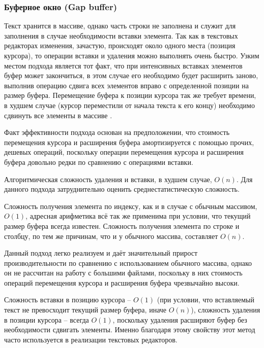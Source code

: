 \documentclass{fefu}
\begin{document}
			\subsubsection{Буферное окно (Gap buffer)}
				\par Текст хранится в массиве, однако часть строки не заполнена и служит для
				заполнения в случае необходимости вставки элемента. Так как в текстовых
				редакторах изменения, зачастую, происходят около одного места (позиция 
				курсора), то операции вставки и удаления можно выполнять очень быстро.
				Узким местом подхода является тот факт, что при интенсивных вставках элементов
				буфер может закончиться, в этом случае его необходимо будет расширить заново,
				выполнив операцию сдвига всех элементов вправо с определенной позиции на размер
				буфера. Перемещение буфера к позиции курсора так же требует времени, в худшем 
				случае (курсор переместили от начала текста к его концу) необходимо сдвинуть
				все элементы в массиве \cite{GapBufferArticle}.
				\par Факт эффективности подхода основан на предположении, что стоимость
				перемещения курсора и расширения буфера амортизируется с помощью прочих,
				дешевых операций, поскольку операции перемещения курсора и расширения буфера
				довольно редки по сравнению с операциями вставки.
				\par Алгоритмическая сложность удаления и вставки, в худшем случае, $O(n)$. Для
				данного подхода затруднительно оценить среднестатистическую сложность.
				\par Сложность получения элемента по индексу, как и в случае с обычным 
				массивом, $O(1)$, адресная арифметика всё так же применима при условии, что
				текущий размер буфера всегда известен. Сложность получения элемента по строке и
				столбцу, по тем же причинам, что и у обычного массива, составляет $O(n)$.
				\par Данный подход легко реализуем и даёт значительный прирост
				производительности по сравнению с использованием обычного массива, однако он не
				рассчитан на работу с большими файлами, поскольку в них стоимость операций 
				перемещения курсора и расширения буфера чрезвычайно высоки.
				\par Сложность вставки в позицию курсора -- $O(1)$ (при условии, что 
				вставляемый текст не превосходит текущий размер буфера, иначе $O(n)$), 
				сложность удаления в позиции курсора -- всегда $O(1)$, поскольку удаления
				расширяют буфер без необходимости сдвигать элементы. Именно благодаря этому
				свойству этот метод часто используется в реализации текстовых редакторов.
\end{document}
